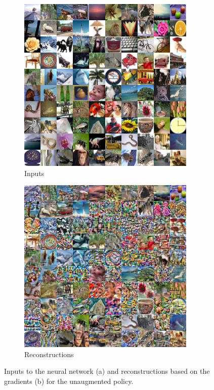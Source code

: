 \begin{figure}[hbt!]
\begin{subfigure}{.49\linewidth}\centering
\includegraphics[width=\textwidth]{grids/data_cifar100_arch_ResNet20-4_epoch_200_optim_inversed_mode_normal_auglist__rlabel_False_ORIGINALS.png}
\caption{Inputs}%
\end{subfigure}%
\hfill
\begin{subfigure}{.49\linewidth}\centering
\includegraphics[width=\textwidth]{grids/data_cifar100_arch_ResNet20-4_epoch_200_optim_inversed_mode_normal_auglist__rlabel_False_RECONSTRUCTIONS.png}
\caption{Reconstructions}%
\end{subfigure}%
\caption{Inputs to the neural network (a) and reconstructions based on the gradients (b) for the unaugmented policy.}
    \label{fig:apprr}
\end{figure}


